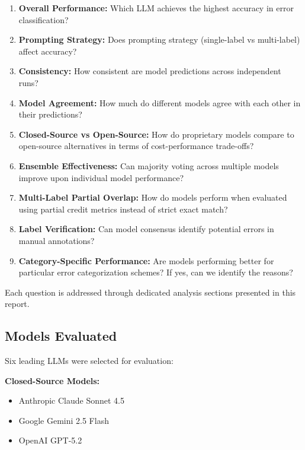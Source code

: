 \documentclass[12pt,a4paper]{article}
\begin{document}
\begin{enumerate}[leftmargin=*]
    \item \textbf{Overall Performance:} Which LLM achieves the highest accuracy in error classification?
    
    \item \textbf{Prompting Strategy:} Does prompting strategy (single-label vs multi-label) affect accuracy?
    
    \item \textbf{Consistency:} How consistent are model predictions across independent runs?
    
    \item \textbf{Model Agreement:} How much do different models agree with each other in their predictions?
    
    \item \textbf{Closed-Source vs Open-Source:} How do proprietary models compare to open-source alternatives in terms of cost-performance trade-offs?
    
    \item \textbf{Ensemble Effectiveness:} Can majority voting across multiple models improve upon individual model performance?
    
    \item \textbf{Multi-Label Partial Overlap:} How do models perform when evaluated using partial credit metrics instead of strict exact match?
    
    \item \textbf{Label Verification:} Can model consensus identify potential errors in manual annotations?
    
    \item \textbf{Category-Specific Performance:} Are models performing better for particular error categorization schemes? If yes, can we identify the reasons?
\end{enumerate}

Each question is addressed through dedicated analysis sections presented in this report.
\subsection{Models Evaluated}

Six leading LLMs were selected for evaluation:

\textbf{Closed-Source Models:}
\begin{itemize}[leftmargin=*]
    \item {Anthropic Claude Sonnet 4.5} 
    \item {Google Gemini 2.5 Flash} 
    \item {OpenAI GPT-5.2} 
\end{itemize}
\end{document}
